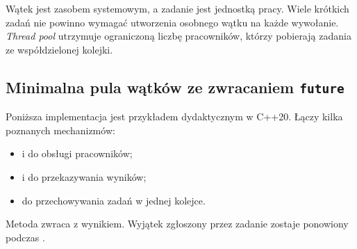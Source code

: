 Wątek jest zasobem systemowym, a zadanie jest jednostką pracy. Wiele
krótkich zadań nie powinno wymagać utworzenia osobnego wątku na każde
wywołanie. \emph{Thread pool} utrzymuje ograniczoną liczbę pracowników,
którzy pobierają zadania ze współdzielonej kolejki.

\subsection{Minimalna pula wątków ze zwracaniem \texttt{future}}

Poniższa implementacja jest przykładem dydaktycznym w C++20.
Łączy kilka poznanych mechanizmów:
\begin{itemize}
\item {} i  do obsługi pracowników;
\item {} i  do przekazywania wyników;
\item {} do przechowywania zadań w jednej kolejce.
\end{itemize}
Metoda  zwraca  z wynikiem.
Wyjątek zgłoszony przez zadanie zostaje ponowiony podczas .

